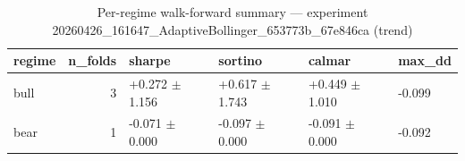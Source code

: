 \begin{table}
\caption{Per-regime walk-forward summary — experiment 20260426_161647_AdaptiveBollinger_653773b_67e846ca (trend)}
\label{tab:regime_pipeline_regime}
\begin{tabular}{lrllll}
\toprule
regime & n_folds & sharpe & sortino & calmar & max_dd \\
\midrule
bull & 3 & +0.272 $\pm$ 1.156 & +0.617 $\pm$ 1.743 & +0.449 $\pm$ 1.010 & -0.099 \\
bear & 1 & -0.071 $\pm$ 0.000 & -0.097 $\pm$ 0.000 & -0.091 $\pm$ 0.000 & -0.092 \\
\bottomrule
\end{tabular}
\end{table}
